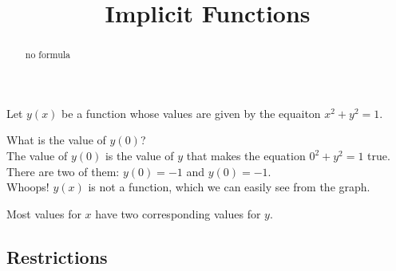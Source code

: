 \documentclass{ximera}
\title{Implicit Functions}
\begin{document}
\begin{abstract}
no formula
\end{abstract}
\maketitle






Let $y(x)$ be a function whose values are given by the equaiton $x^2 + y^2 = 1$.

What is the value of $y(0)$? \\

The value of $y(0)$ is the value of $y$ that makes the equation $0^2 + y^2 = 1$ true. \\

There are two of them: $y(0) = -1$ and $y(0) = -1$. \\


Whoops!  $y(x)$ is not a function, which we can easily see from the graph.






\begin{image}
\end{image}


Most values for $x$ have two corresponding values for $y$. \\







\subsection{Restrictions}
\end{document}
